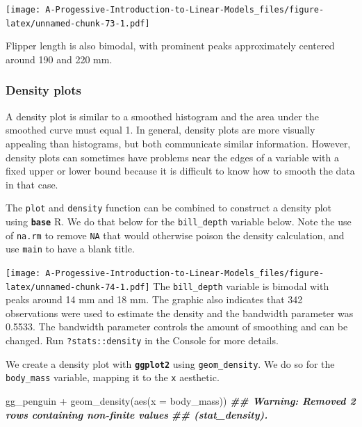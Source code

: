 \documentclass[
]{book}
\newenvironment{Shaded}{\begin{snugshade}}{\end{snugshade}}
\newcommand{\AttributeTok}[1]{\textcolor[rgb]{0.77,0.63,0.00}{#1}}
\newcommand{\ConstantTok}[1]{\textcolor[rgb]{0.00,0.00,0.00}{#1}}
\newcommand{\DocumentationTok}[1]{\textcolor[rgb]{0.56,0.35,0.01}{\textbf{\textit{#1}}}}
\newcommand{\FunctionTok}[1]{\textcolor[rgb]{0.00,0.00,0.00}{#1}}
\newcommand{\NormalTok}[1]{#1}
\newcommand{\SpecialCharTok}[1]{\textcolor[rgb]{0.00,0.00,0.00}{#1}}
\newcommand{\StringTok}[1]{\textcolor[rgb]{0.31,0.60,0.02}{#1}}
\theoremstyle{definition}
\theoremstyle{definition}
\theoremstyle{definition}
\theoremstyle{definition}
\theoremstyle{remark}
\begin{document}
\texttt{[image: A-Progessive-Introduction-to-Linear-Models\_files/figure-latex/unnamed-chunk-73-1.pdf]}

Flipper length is also bimodal, with prominent peaks approximately centered around 190 and 220 mm.

\hypertarget{density-plots}{%
\subsubsection{Density plots}\label{density-plots}}

A density plot is similar to a smoothed histogram and the area under the smoothed curve must equal 1. In general, density plots are more visually appealing than histograms, but both communicate similar information. However, density plots can sometimes have problems near the edges of a variable with a fixed upper or lower bound because it is difficult to know how to smooth the data in that case.

The \texttt{plot} and \texttt{density} function can be combined to construct a density plot using \textbf{\texttt{base}} R. We do that below for the \texttt{bill\_depth} variable below. Note the use of \texttt{na.rm} to remove \texttt{NA} that would otherwise poison the density calculation, and use \texttt{main} to have a blank title.

\begin{Shaded}
\end{Shaded}

\texttt{[image: A-Progessive-Introduction-to-Linear-Models\_files/figure-latex/unnamed-chunk-74-1.pdf]}
The \texttt{bill\_depth} variable is bimodal with peaks around 14 mm and 18 mm. The graphic also indicates that 342 observations were used to estimate the density and the bandwidth parameter was 0.5533. The bandwidth parameter controls the amount of smoothing and can be changed. Run \texttt{?stats::density} in the Console for more details.

We create a density plot with \textbf{\texttt{ggplot2}} using \texttt{geom\_density}. We do so for the \texttt{body\_mass} variable, mapping it to the \texttt{x} aesthetic.

\begin{Shaded}
\begin{Highlighting}[]
\NormalTok{gg\_penguin }\SpecialCharTok{+} \FunctionTok{geom\_density}\NormalTok{(}\FunctionTok{aes}\NormalTok{(}\AttributeTok{x =}\NormalTok{ body\_mass))}
\DocumentationTok{\#\# Warning: Removed 2 rows containing non{-}finite values}
\DocumentationTok{\#\# (stat\_density).}
\end{Highlighting}
\end{Shaded}
\end{document}
